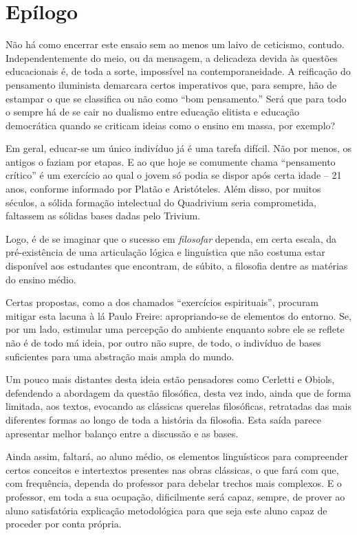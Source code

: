 \documentclass[12pt,a4paper]{article}
\begin{document}
	


	\newpage
	
	\section{Epílogo}

	Não há como encerrar este ensaio sem ao menos um laivo de ceticismo, 
	contudo. Independentemente do meio, ou da mensagem, a delicadeza 
	devida às questões educacionais é, de toda a sorte, impossível na 
	contemporaneidade. A reificação do pensamento iluminista demarcara 
	certos imperativos que, para sempre, hão de estampar o que se 
	classifica ou não como “bom pensamento.” Será que para todo o sempre 
	há de se cair no dualismo entre educação elitista e educação 
	democrática quando se criticam ideias como o ensino em massa, 
	por exemplo? 

	Em geral, educar-se um único indivíduo já é uma tarefa difícil. 
	Não por menos, os antigos o faziam por etapas. E ao que hoje se 
	comumente chama “pensamento crítico” é um exercício ao qual o 
	jovem só podia se dispor após certa idade -- 21 anos, conforme 
	informado por Platão e Aristóteles. Além disso, por muitos 
	séculos, a sólida formação intelectual do Quadrivium seria 
	comprometida, faltassem as sólidas bases dadas pelo Trivium. 

	Logo, é de se imaginar que o sucesso em \textit{filosofar} 
	dependa, em certa escala, da pré-existência de uma articulação 
	lógica e linguística que não costuma estar disponível aos 
	estudantes que encontram, de súbito, a filosofia dentre as 
	matérias do ensino médio. 

	Certas propostas, como a dos chamados “exercícios espirituais”, 
	procuram mitigar esta lacuna à lá Paulo Freire: apropriando-se 
	de elementos do entorno. Se, por um lado, estimular uma percepção 
	do ambiente enquanto sobre ele se reflete não é de todo má ideia, 
	por outro não supre, de todo, o indivíduo de bases suficientes 
	para uma abstração mais ampla do mundo. 

	Um pouco mais distantes desta ideia estão pensadores como Cerletti e 
	Obiols, defendendo a abordagem da questão filosófica, desta vez 
	indo, ainda que de forma limitada, aos textos, evocando as clássicas 
	querelas filosóficas, retratadas das mais diferentes formas ao longo 
	de toda a história da filosofia. Esta saída parece apresentar 
	melhor balanço entre a discussão e as bases. 

	Ainda assim, faltará, 
	ao aluno médio, os elementos linguísticos para compreender certos 
	conceitos e intertextos presentes nas obras clássicas, o que fará 
	com que, com frequência, dependa do professor para debelar trechos 
	mais complexos. E o professor, em toda a sua ocupação, dificilmente 
	será capaz, sempre, de prover ao aluno satisfatória explicação 
	metodológica para que seja este aluno capaz de proceder por 
	conta própria. 
\end{document}
